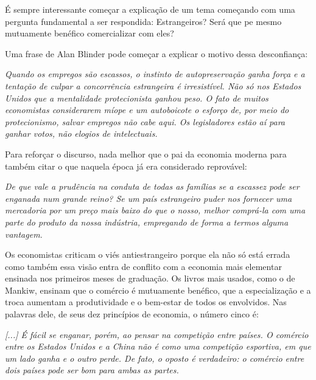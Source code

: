 É sempre interessante começar a explicação de um tema começando com uma pergunta fundamental a ser respondida: Estrangeiros? Será que pe mesmo mutuamente benéfico comercializar com eles?

Uma frase de Alan Blinder pode começar a explicar o motivo dessa desconfiança:

\begin{citacao}
    \textit{
        Quando os empregos são escassos, o instinto de autopreservação ganha força e a tentação de culpar a concorrência estrangeira é irresistível. Não só nos Estados Unidos que a mentalidade protecionista ganhou peso. O fato de muitos economistas considerarem míope e um autoboicote o esforço de, por meio do protecionismo, salvar empregos não cabe aqui. Os legisladores estão aí para ganhar votos, não elogios de intelectuais.
     } \newline 
    \cite{blinder1987hard}
\end{citacao}

Para reforçar o discurso, nada melhor que o pai da economia moderna para também citar o que naquela época já era considerado reprovável:

\begin{citacao}
    \textit{
         De que vale a prudência na conduta de todas as famílias se a escassez pode ser enganada num grande reino? Se um país estrangeiro puder nos fornecer uma mercadoria por um preço mais baixo do que o nosso, melhor comprá-la com uma parte do produto da nossa indústria, empregando de forma a termos alguma vantagem.
    } \newline
    \cite{smith1776inquiry}
\end{citacao}

Os economistas criticam o viés antiestrangeiro porque ela não só está errada como também essa visão entra de conflito com a economia mais elementar ensinada nos primeiros meses de graduação. Os livros mais usados, como o de Mankiw, ensinam que o comércio é mutuamente benéfico, que a especialização e a troca aumentam a produtividade e o bem-estar de todos os envolvidos. Nas palavras dele, de seus dez princípios de economia, o número cinco é:

\begin{citacao}
    \textit{
        [...] É fácil se enganar, porém, ao pensar na competição entre países. O comércio entre os Estados Unidos e a China não é como uma competição esportiva, em que um lado ganha e o outro perde. De fato, o oposto é verdadeiro: o comércio entre dois países pode ser bom para ambas as partes.
    } \newline
    \cite{mankiw2020introducao}
\end{citacao}

